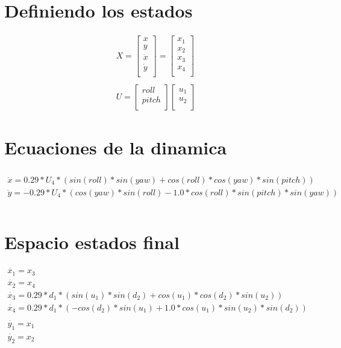 \documentclass[varwidth,margin=3mm]{standalone}
\begin{document}
\section{Definiendo los estados}
\begin{gather*}
	X = \left [ \begin{matrix}
		x\\
		y\\
		\dot{x}\\
		\dot{y}\\
	\end{matrix}
	\right ] =
	\left [ \begin{matrix}
		x_1\\
		x_2\\
		x_3\\
		x_4\\
	\end{matrix}
	\right ]
	\\
	\\
	U = \left [ \begin{matrix}
		roll\\
		pitch\\
	\end{matrix}
	\right ]
	\left [ \begin{matrix}
		u_1\\
		u_2\\
	\end{matrix}
	\right ]
\end{gather*}



\section{Ecuaciones de la dinamica}
\begin{gather*}
	\\
	\ddot{x} = 0.29*U_4*(sin(roll)*sin(yaw) + cos(roll)*cos(yaw)*sin(pitch))\\
	\ddot{y}= -0.29*U_4*(cos(yaw)*sin(roll) - 1.0*cos(roll)*sin(pitch)*sin(yaw))\\
	\\
\end{gather*}
\section{Espacio estados final}
\begin{gather*}
	\dot{x_1} = x_3\\
	\dot{x_2} = x_4\\
	\dot{x_3} = 0.29*d_1*(sin(u_1)*sin(d_2) + cos(u_1)*cos(d_2)*sin(u_2))\\
	\dot{x_4} = 0.29*d_1*(-cos(d_2)*sin(u_1) + 1.0*cos(u_1)*sin(u_2)*sin(d_2))\\
	\\
	\dot{y_1} = x_1\\
	\dot{y_2} = x_2\\
\end{gather*}
\end{document}
